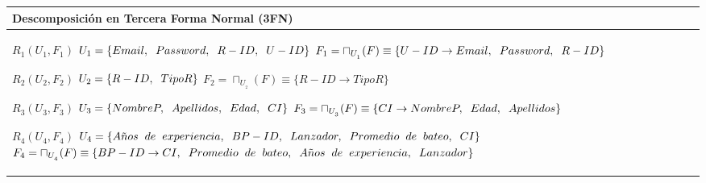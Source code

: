 \documentclass{report}
\begin{document}
    \begin{tabularx}{\textwidth}{|X|}
        \toprule
        \hfil \textbf{Descomposición en Tercera Forma Normal (3FN)} \\
        \midrule
        $ R_{1} ( U_{1} , F_{1} ) $ \newline 
        $ U_{1} = \{{Email, \hspace{0.2cm}  Password, \hspace{0.2cm}  R-ID, \hspace{0.2cm}  U-ID}\} $ \newline 
        $ F_{1} = \sqcap_{U_{_{1}}}(F) \equiv \{U-ID \rightarrow Email, \hspace{0.2cm} Password, \hspace{0.2cm} R-ID \} $\newline 
        
        $ R_{2} ( U_{2} , F_{2} ) $ \newline 
        $ U_{2} = \{{R-ID, \hspace{0.2cm}  TipoR}\} $ \newline 
        $ F_{2} = \sqcap_{U_{_{2}}}(F) \equiv \{R-ID \rightarrow TipoR \} $\newline 
        
        $ R_{3} ( U_{3} , F_{3} ) $ \newline 
        $ U_{3} = \{{NombreP, \hspace{0.2cm}  Apellidos, \hspace{0.2cm}  Edad, \hspace{0.2cm}  CI}\} $ \newline 
        $ F_{3} = \sqcap_{U_{_{3}}}(F) \equiv \{CI \rightarrow NombreP, \hspace{0.2cm} Edad, \hspace{0.2cm} Apellidos \} $\newline 
        
        $ R_{4} ( U_{4} , F_{4} ) $ \newline 
        $ U_{4} = \{{A\tilde{n}os \hspace{0.2cm} de \hspace{0.2cm} experiencia, \hspace{0.2cm}  BP-ID, \hspace{0.2cm}  Lanzador, \hspace{0.2cm}  Promedio \hspace{0.2cm} de \hspace{0.2cm} bateo, \hspace{0.2cm}  CI}\} $ \newline 
        $ F_{4} = \sqcap_{U_{_{4}}}(F) \equiv \{BP-ID \rightarrow CI, \hspace{0.2cm} Promedio \hspace{0.2cm} de \hspace{0.2cm} bateo, \hspace{0.2cm} A\tilde{n}os \hspace{0.2cm} de \hspace{0.2cm} experiencia, \hspace{0.2cm} Lanzador \} $\newline 
        

\end{tabularx}
\end{document}
